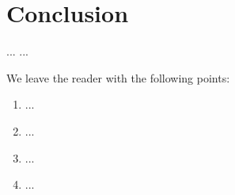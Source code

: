\section{Conclusion}\label{sec:SMMF_conclusion}



...
...



We leave the reader with the following points:

\begin{enumerate}
	\item{...}
	
	\item{...}
	
	\item{...}
	
	\item{...}
\end{enumerate}

